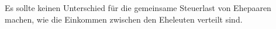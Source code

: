 Es sollte keinen Unterschied für die gemeinsame Steuerlast von Ehepaaren machen, wie die Einkommen zwischen den Eheleuten verteilt sind.